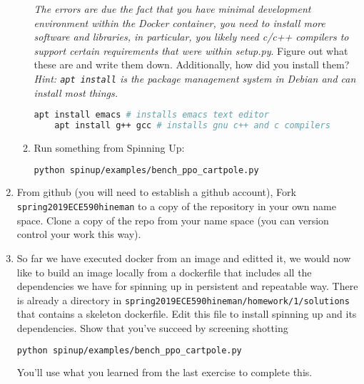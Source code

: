 \documentclass{article}
\begin{document}
\begin{enumerate}
\begin{enumerate}
  {\em The errors are due the fact that you have minimal development environment within the Docker container, you need to install more software and libraries,
    in particular, you likely need c/c++ compilers to support certain requirements that were within setup.py}. Figure out
  what these are and write them down. Additionally, how did you install them? {\em Hint: {\tt apt install} is the package management system in Debian and can install
    most things.}
  \begin{lstlisting}[language=bash]
    apt install emacs # installs emacs text editor
    apt install g++ gcc # installs gnu c++ and c compilers
  \end{lstlisting}
\item Run something from Spinning Up:
  \begin{lstlisting}[language=bash]
    python spinup/examples/bench_ppo_cartpole.py
  \end{lstlisting}
\end{enumerate}
\item
  From github (you will need to establish a github account), Fork {\tt
spring2019ECE590hineman} to a copy of the repository in your own name space.
Clone a copy of the repo from your name space (you can version control your work
this way).
\item
  So far we have executed docker from an image and editted it, we would now like
to build an image locally from a dockerfile that includes all the dependencies
we have for spinning up in persistent and repeatable way. There is already a
directory in {\tt spring2019ECE590hineman/homework/1/solutions} that contains a
skeleton dockerfile. Edit this file to install spinning up and its dependencies.
Show that you've succeed by screening shotting
\begin{lstlisting}[language=bash]
  python spinup/examples/bench_ppo_cartpole.py
\end{lstlisting}
You'll use what you learned from the last exercise to complete this.
\end{enumerate}
\end{document}
